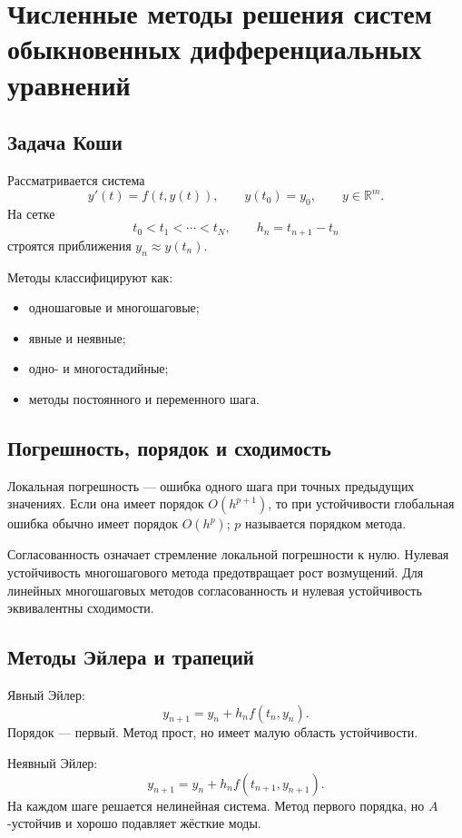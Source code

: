 \section{Численные методы решения систем обыкновенных дифференциальных уравнений}
\label{sec:numerical-ode}

\subsection{Задача Коши}

Рассматривается система
\[
    y'(t)=f(t,y(t)),
    \qquad
    y(t_0)=y_0,
    \qquad
    y\in\mathbb R^m.
\]
На сетке
\[
    t_0<t_1<\cdots<t_N,
    \qquad h_n=t_{n+1}-t_n
\]
строятся приближения $y_n\approx y(t_n)$.

Методы классифицируют как:
\begin{itemize}
    \item одношаговые и многошаговые;
    \item явные и неявные;
    \item одно- и многостадийные;
    \item методы постоянного и переменного шага.
\end{itemize}

\subsection{Погрешность, порядок и сходимость}

Локальная погрешность --- ошибка одного шага при точных предыдущих значениях.
Если она имеет порядок $O(h^{p+1})$, то при устойчивости глобальная ошибка обычно
имеет порядок $O(h^p)$; $p$ называется порядком метода.

Согласованность означает стремление локальной погрешности к нулю. Нулевая
устойчивость многошагового метода предотвращает рост возмущений. Для линейных
многошаговых методов согласованность и нулевая устойчивость эквивалентны
сходимости.

\subsection{Методы Эйлера и трапеций}

Явный Эйлер:
\[
    y_{n+1}=y_n+h_nf(t_n,y_n).
\]
Порядок --- первый. Метод прост, но имеет малую область устойчивости.

Неявный Эйлер:
\[
    y_{n+1}=y_n+h_nf(t_{n+1},y_{n+1}).
\]
На каждом шаге решается нелинейная система. Метод первого порядка, но
$A$-устойчив и хорошо подавляет жёсткие моды.

